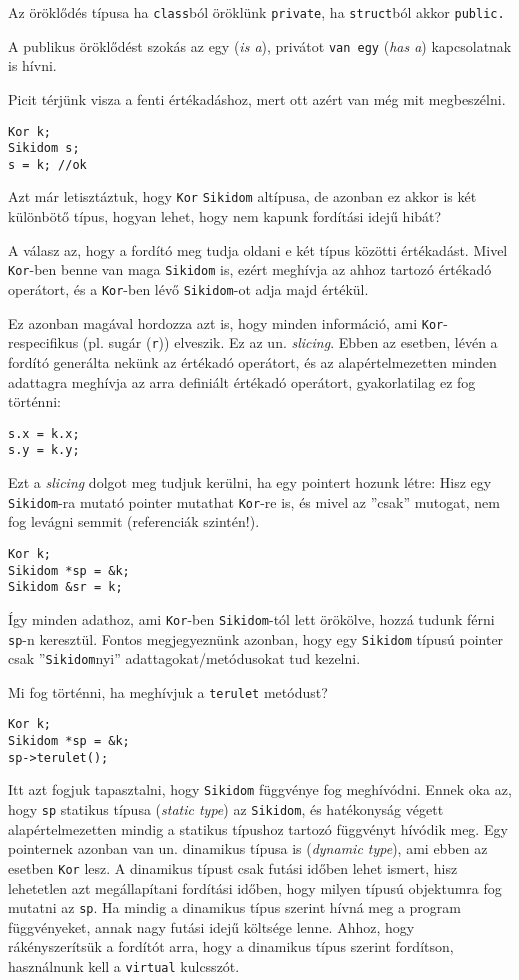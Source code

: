 \documentclass[a4paper,11.5pt,table]{article}
\begin{document}
	Az öröklődés típusa ha \texttt{class}ból öröklünk \texttt{private}, ha \texttt{struct}ból akkor \texttt{public.}
	\begin{note}
		A publikus öröklődést szokás {az egy} (\textit{is a}), privátot \texttt{van egy} (\textit{has a}) kapcsolatnak is hívni.
	\end{note}
	Picit térjünk visza a fenti értékadáshoz, mert ott azért van még mit megbeszélni.
	\begin{lstlisting}
Kor k;
Sikidom s;
s = k; //ok
	\end{lstlisting}
	Azt már letisztáztuk, hogy \texttt{Kor} \texttt{Sikidom} altípusa, de azonban ez akkor is két különbötő típus, hogyan lehet, hogy nem kapunk fordítási idejű hibát?
	
	A válasz az, hogy a fordító meg tudja oldani e két típus közötti értékadást. Mivel \texttt{Kor}-ben benne van maga \texttt{Sikidom} is, ezért meghívja az ahhoz tartozó értékadó operátort, és a \texttt{Kor}-ben lévő \texttt{Sikidom}-ot adja majd értékül.
	
	Ez azonban magával hordozza azt is, hogy minden információ, ami \texttt{Kor}-respecifikus (pl. sugár (\texttt{r})) elveszik. Ez az un. \textit{slicing}. Ebben az esetben, lévén a fordító generálta nekünk az értékadó operátort, és az alapértelmezetten minden adattagra meghívja az arra definiált értékadó operátort, gyakorlatilag ez fog történni:
	\begin{lstlisting}
s.x = k.x;
s.y = k.y;
	\end{lstlisting}
	
	Ezt a \textit{slicing} dolgot meg tudjuk kerülni, ha egy pointert hozunk létre: Hisz egy \texttt{Sikidom}-ra mutató pointer mutathat \texttt{Kor}-re is, és mivel az ''csak'' mutogat, nem fog levágni semmit (referenciák szintén!). 
	\begin{lstlisting}
Kor k;
Sikidom *sp = &k; 
Sikidom &sr = k;
	\end{lstlisting}
	Így minden adathoz, ami \texttt{Kor}-ben \texttt{Sikidom}-tól lett örökölve, hozzá tudunk férni \texttt{sp}-n keresztül. Fontos megjegyeznünk azonban, hogy egy \texttt{Sikidom} típusú pointer csak ''\texttt{Sikidom}nyi'' adattagokat/metódusokat tud kezelni.
	
	Mi fog történni, ha meghívjuk a \texttt{terulet} metódust?
	\begin{lstlisting}
Kor k;
Sikidom *sp = &k;
sp->terulet();
	\end{lstlisting}
	Itt azt fogjuk tapasztalni, hogy \texttt{Sikidom} függvénye fog meghívódni. Ennek oka az, hogy \texttt{sp} statikus típusa (\textit{static type}) az \texttt{Sikidom}, és hatékonyság végett alapértelmezetten mindig a statikus típushoz tartozó függvényt hívódik meg. Egy pointernek azonban van un. dinamikus típusa is (\textit{dynamic type}), ami ebben az esetben \texttt{Kor} lesz. A dinamikus típust csak futási időben lehet ismert, hisz lehetetlen azt megállapítani fordítási időben, hogy milyen típusú objektumra fog mutatni az \texttt{sp}. Ha mindig a dinamikus típus szerint hívná meg a program függvényeket, annak nagy futási idejű költsége lenne. Ahhoz, hogy rákényszerítsük a fordítót arra, hogy a dinamikus típus szerint fordítson, használnunk kell a \texttt{virtual} kulcsszót.
\end{document}
